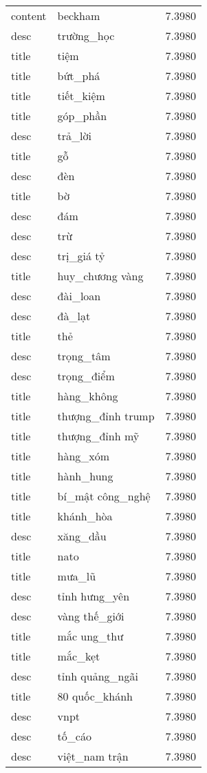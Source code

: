 \documentclass{article}
\begin{document}
\begin{tabular}{lll}
content & beckham & 7.3980\\
desc & trường\_học & 7.3980\\
title & tiệm & 7.3980\\
title & bứt\_phá & 7.3980\\
title & tiết\_kiệm & 7.3980\\
title & góp\_phần & 7.3980\\
desc & trả\_lời & 7.3980\\
title & gỗ & 7.3980\\
desc & đèn & 7.3980\\
title & bờ & 7.3980\\
desc & đám & 7.3980\\
desc & trừ & 7.3980\\
desc & trị\_giá tỷ & 7.3980\\
title & huy\_chương vàng & 7.3980\\
desc & đài\_loan & 7.3980\\
desc & đà\_lạt & 7.3980\\
title & thẻ & 7.3980\\
desc & trọng\_tâm & 7.3980\\
desc & trọng\_điểm & 7.3980\\
title & hàng\_không & 7.3980\\
title & thượng\_đỉnh trump & 7.3980\\
title & thượng\_đỉnh mỹ & 7.3980\\
title & hàng\_xóm & 7.3980\\
title & hành\_hung & 7.3980\\
title & bí\_mật công\_nghệ & 7.3980\\
title & khánh\_hòa & 7.3980\\
desc & xăng\_dầu & 7.3980\\
title & nato & 7.3980\\
title & mưa\_lũ & 7.3980\\
desc & tỉnh hưng\_yên & 7.3980\\
desc & vàng thế\_giới & 7.3980\\
title & mắc ung\_thư & 7.3980\\
title & mắc\_kẹt & 7.3980\\
desc & tỉnh quảng\_ngãi & 7.3980\\
title & 80 quốc\_khánh & 7.3980\\
desc & vnpt & 7.3980\\
desc & tố\_cáo & 7.3980\\
desc & việt\_nam trận & 7.3980\\

\end{tabular}
\end{document}
